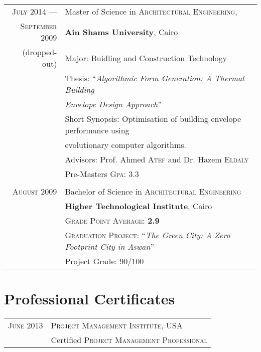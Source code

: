 \documentclass[a4paper,11pt]{article} %
\begin{document}
\begin{tabular}{r|l}	
\textsc{July} 2014 --- & Master of Science in \textsc{Architectural Engineering},\\ 
\textsc{September} 2009 &\textbf{Ain Shams University}, Cairo\\
\small(dropped-out)& Major: Buidling and Construction Technology\\
& Thesis: ``\emph{Algorithmic Form Generation: A Thermal Building}\\
&\emph{Envelope Design Approach}'' \\
&\small Short Synopsis: Optimisation of building envelope performance using\\
&\small evolutionary computer algorithms.\\
& \small Advisors: Prof. Ahmed \textsc{Atef} and Dr. Hazem \textsc{Eldaly}\\
&\normalsize Pre-Masters \textsc{Gpa}: 3.3\\
\multicolumn{2}{c}{} \\


\textsc{August} 2009& Bachelor of Science in \textsc{Architectural Engineering} \\
& \normalsize\textbf{Higher Technological Institute}, Cairo\\
&\small \textsc{Grade Point Average}: \textbf{2.9} \\
&\small \textsc{Graduation Project:} ``\emph{The Green City: A Zero Footprint City in Aswan}''\\
&\small Project Grade: 90/100\\

\end{tabular}

\section{Professional Certificates}

\begin{tabular}{r|l}
\hspace{9.5mm}\textsc{June} 2013 & \textsc{Project Management Institute}, USA\\
& Certified \textsc{Project Management Professional}\\

\end{tabular}
\end{document}
